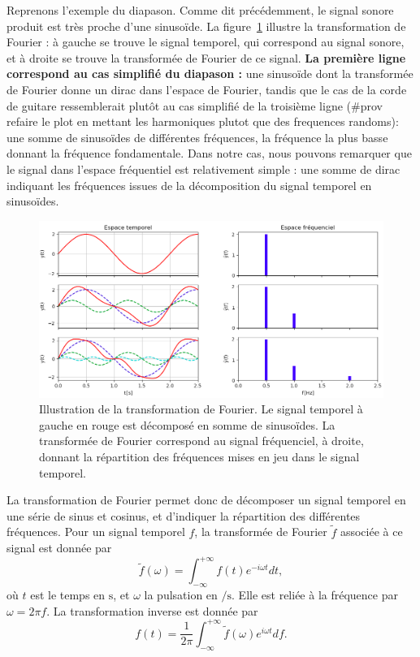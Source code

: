 \documentclass[11pt, twoside, a4paper, openright]{report}
\begin{document}
Reprenons l'exemple du diapason. Comme dit précédemment, le signal sonore produit est très proche d'une sinusoïde. La figure~\ref{fig:example_tf} illustre la transformation de Fourier : à gauche se trouve le signal temporel, qui correspond au signal sonore, et à droite se trouve la transformée de Fourier de ce signal.
\textbf{La première ligne correspond au cas simplifié du diapason :}
une sinusoïde dont la transformée de Fourier donne un dirac dans l'espace de Fourier, tandis que le cas de la corde de guitare ressemblerait plutôt au cas simplifié de la troisième ligne (\#prov refaire le plot en mettant les harmoniques plutot que des frequences randoms):
une somme de sinusoïdes de différentes fréquences, la fréquence la plus basse donnant la fréquence fondamentale. Dans notre cas, nous pouvons remarquer que le signal dans l'espace fréquentiel est relativement simple : une somme de dirac indiquant les fréquences issues de la décomposition du signal temporel en sinusoïdes.
\begin{figure}[h]
  \centering
  \includegraphics[scale=0.5]{example_tf}
  \caption{Illustration de la transformation de Fourier. Le signal temporel à gauche en rouge est décomposé en somme de sinusoïdes. La transformée de Fourier correspond au signal fréquenciel, à droite, donnant la répartition des fréquences mises en jeu dans le signal temporel.}
  \label{fig:example_tf}
\end{figure}

La transformation de Fourier permet donc de décomposer un signal temporel en une série de sinus et cosinus, et d'indiquer la répartition des différentes fréquences. Pour un signal temporel $f$, la transformée de Fourier $\tilde f$ associée à ce signal est donnée par
\begin{equation}
  \label{eq:def_tf}
  \tilde f(\omega) = \int_{-\infty}^{+\infty}f(t) e^{- i \omega t} dt ,
\end{equation}
où $t$ est le temps en $\si{\second}$, et $\omega$ la pulsation en $\si{\per\second}$. Elle est reliée à la fréquence par $\omega = 2 \pi f$. La transformation inverse est donnée par
\begin{equation}
  \label{eq:def_tf_inv}
   f(t) = \frac{1}{2 \pi}\int_{-\infty}^{+\infty} \tilde f(\omega) e^{ i \omega t} df .
\end{equation}
\end{document}
